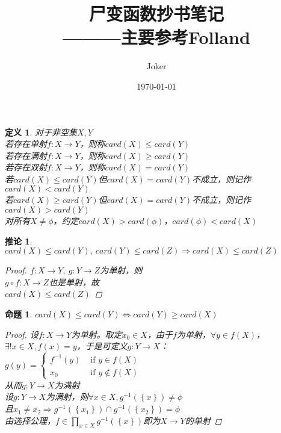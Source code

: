 \documentclass[12pt, a4paper, oneside]{ctexbook}
\title{{\Huge{\textbf{尸变函数抄书笔记}}}\\———主要参考Folland}
\author{Joker}
\date{\today}
\newtheorem{definition}[theorem]{定义}
\newtheorem{corollary}[theorem]{推论}
\newtheorem{proposition}[theorem]{命题}
\begin{document}
\begin{definition}
    对于非空集$X,Y$\\
    若存在单射$f:X\rightarrow Y$，则称$card(X)\leq card(Y)$\\
    若存在满射$f:X\rightarrow Y$，则称$card(X)\geq card(Y)$\\
    若存在双射$f:X\rightarrow Y$，则称$card(X)= card(Y)$\\
    若$card(X)\leq card(Y)$但$card(X)= card(Y)$不成立，则记作$card(X)<card(Y)$\\
    若$card(X)\geq card(Y)$但$card(X)= card(Y)$不成立，则记作$card(X)>card(Y)$\\
    对所有$X\neq\phi$，约定$card(X)>card(\phi)$，$card(\phi)<card(X)$
\end{definition}
\begin{corollary}
    $card(X)\leq card(Y),\ card(Y)\leq card(Z)\Rightarrow card(X)\leq card(Z)$
    \begin{proof}
        $f:X\rightarrow Y,\ g:Y\rightarrow Z$为单射，则\\
        $g\circ f:X\rightarrow Z$也是单射，故\\
        $card(X)\leq card(Z)$
    \end{proof}
\end{corollary}
\begin{proposition}
    $card(X)\leq card(Y)\Leftrightarrow card(Y)\geq card(X)$
    \begin{proof}
        设$f:X\rightarrow Y$为单射。取定$x_0\in X$，由于$f$为单射，$\forall y\in f(X)$，\\
        $\exists ! x\in X,f(x)=y$，于是可定义$g:Y\rightarrow X$：\\
        $g(y)=\begin{cases}
            f^{-1}(y)& \text{ if } y\in f(X) \\
            x_0& \text{ if } y\notin f(X)
          \end{cases}$\\
        从而$g:Y\rightarrow X$为满射\\[0.5cm]
        设$g:Y\rightarrow X$为满射，则$\forall x\in X,g^{-1}(\left\{x\right\})\neq\phi$\\
        且$x_1\neq x_2\Rightarrow g^{-1}(\left\{x_1\right\})\cap g^{-1}(\left\{x_2\right\})=\phi$\\
        由选择公理，$f\in \prod_{x\in X}g^{-1}(\left\{x\right\})$即为$X\rightarrow Y$的单射       
    \end{proof}
\end{proposition}
\end{document}
